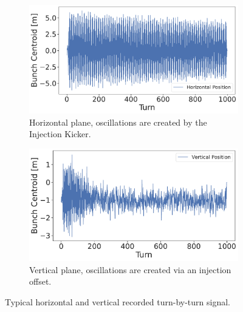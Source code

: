 \begin{figure}[!htb]
    \centering
    \begin{subfigure}[b]{0.47\textwidth}
        \includegraphics[width=\linewidth]{images/kek/horizontal_tbt_ler.pdf}
        \caption{Horizontal plane, oscillations are created by the Injection Kicker.}
    \end{subfigure}
    \hfill
    \begin{subfigure}[b]{0.48\textwidth}
        \includegraphics[width=\linewidth]{images/kek/vertical_tbt_ler.pdf}
        \caption{Vertical plane, oscillations are created via an injection offset.}
    \end{subfigure}
    \caption{Typical horizontal and vertical recorded turn-by-turn signal.}
    \label{fig:kek:tbt_signal}
\end{figure}



\FloatBarrier
\subsubsection{}

